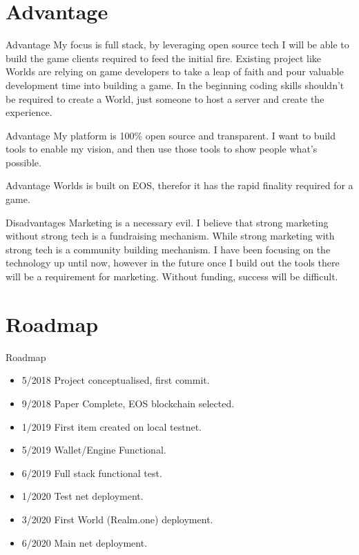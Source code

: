 \documentclass[final, ngerman, xcolor=pdftex, dvipsnames, table, aspectratio=169, 14pt]{beamer}
\begin{document}
\section{Advantage}
\begin{frame}{Advantage}
My focus is full stack, by leveraging open source tech I will be able to build the game clients required to feed the initial fire. Existing project like Worlds are relying on game developers to take a leap of faith and pour valuable development time into building a game. In the beginning coding skills shouldn't be required to create a World, just someone to host a server and create the experience. 
\end{frame}

\begin{frame}{Advantage}
My platform is 100\% open source and transparent. I want to build tools to enable my vision, and then use those tools to show people what's possible.
\end{frame}

\begin{frame}{Advantage}
Worlds is built on EOS, therefor it has the rapid finality required for a game. 
\end{frame}

\begin{frame}{Disadvantages}
Marketing is a necessary evil. I believe that strong marketing without strong tech is a fundraising mechanism. While strong marketing with strong tech is a community building mechanism. I have been focusing on the technology up until now, however in the future once I build out the tools there will be a requirement for marketing. Without funding, success will be difficult.  
\end{frame}

\section{Roadmap}
\begin{frame}{Roadmap}
\begin{itemize}
\small
\item{5/2018} Project conceptualised, first commit.
\item{9/2018} Paper Complete, EOS blockchain selected.
\item{1/2019} First item created on local testnet.
\item{5/2019} Wallet/Engine Functional.
\item{6/2019} Full stack functional test.
\item{1/2020} Test net deployment.
\item{3/2020} First World (Realm.one) deployment.
\item{6/2020} Main net deployment.
\end{itemize}

\end{frame}
\end{document}
